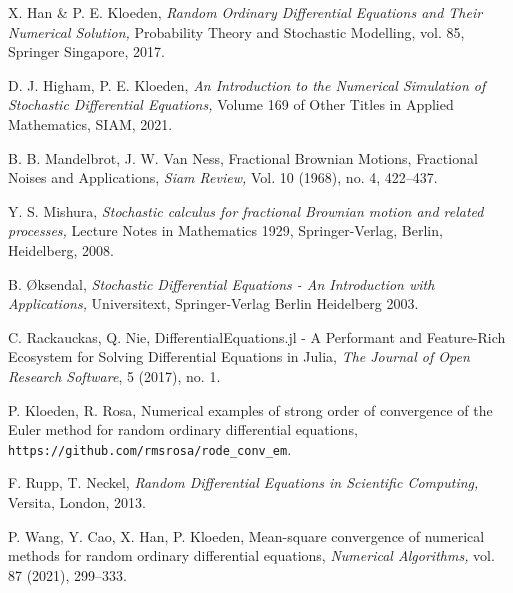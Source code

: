 \documentclass[reqno,12pt]{amsart}
\theoremstyle{plain}%
\theoremstyle{definition}
\begin{document}
\begin{thebibliography}{25}
     X. Han \& P. E. Kloeden, \emph{Random Ordinary Differential Equations and Their Numerical Solution,} Probability Theory and Stochastic Modelling, vol. 85, Springer Singapore, 2017.

     D. J. Higham, P. E. Kloeden, \emph{An Introduction to the Numerical Simulation of Stochastic Differential Equations,} Volume 169 of Other Titles in Applied Mathematics, SIAM, 2021.

     B. B. Mandelbrot, J. W. Van Ness, Fractional Brownian Motions, Fractional Noises and Applications, \emph{Siam Review,} Vol. 10 (1968), no. 4, 422--437.

     Y. S. Mishura, \emph{Stochastic calculus for fractional Brownian motion and related processes,} Lecture Notes in Mathematics 1929, Springer-Verlag, Berlin, Heidelberg, 2008.

     B. {\O}ksendal, \emph{Stochastic Differential Equations - An Introduction with Applications,} Universitext, Springer-Verlag Berlin Heidelberg 2003.

     C. Rackauckas, Q. Nie, DifferentialEquations.jl - A Performant and Feature-Rich Ecosystem for Solving Differential Equations in Julia, \emph{The Journal of Open Research Software}, 5 (2017), no. 1.

     P. Kloeden, R. Rosa, Numerical examples of strong order of convergence of the Euler method for random ordinary differential equations, \texttt{https://github.com/rmsrosa/rode\_conv\_em}.

     F. Rupp, T. Neckel, \emph{Random Differential Equations in Scientific Computing,} Versita, London, 2013.

     P. Wang, Y. Cao, X. Han, P. Kloeden, Mean-square convergence of numerical methods for random ordinary differential equations, \emph{Numerical Algorithms,} vol. 87 (2021), 299--333.

\end{thebibliography}
\end{document}
